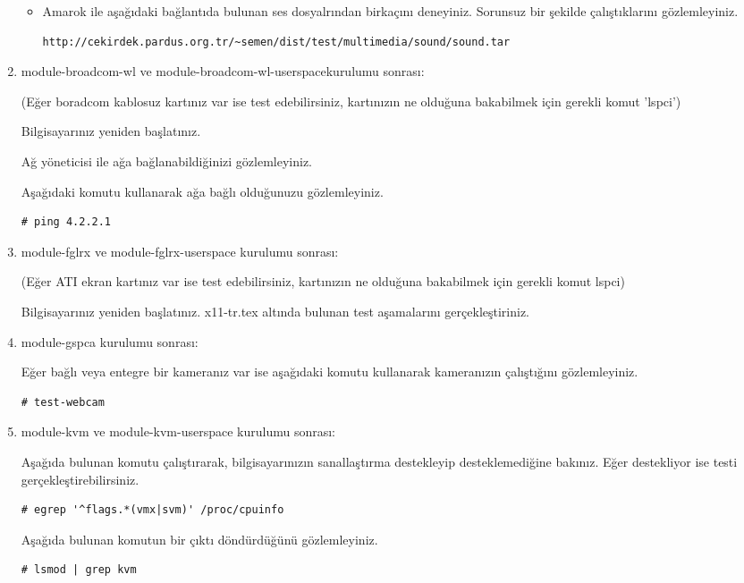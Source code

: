 \documentclass[a4paper,10pt]{article}
\begin{document}
\begin{enumerate}
\begin{itemize}
\item Amarok ile aşağıdaki bağlantıda bulunan ses dosyalrından birkaçını deneyiniz. Sorunsuz bir şekilde çalıştıklarını gözlemleyiniz.
\begin{verbatim}
http://cekirdek.pardus.org.tr/~semen/dist/test/multimedia/sound/sound.tar 
\end{verbatim}

\end{itemize}

\item module-broadcom-wl ve module-broadcom-wl-userspacekurulumu sonrası: 

(Eğer boradcom kablosuz kartınız var ise test edebilirsiniz, kartınızın ne olduğuna bakabilmek için gerekli komut 'lspci')

Bilgisayarınız yeniden başlatınız.

Ağ yöneticisi ile ağa bağlanabildiğinizi gözlemleyiniz.

Aşağıdaki komutu kullanarak ağa bağlı olduğunuzu gözlemleyiniz.
\begin{verbatim}
# ping 4.2.2.1 
\end{verbatim}

\item module-fglrx ve module-fglrx-userspace kurulumu sonrası: 

(Eğer ATI ekran kartınız var ise test edebilirsiniz, kartınızın ne olduğuna bakabilmek için gerekli komut lspci)

Bilgisayarınız yeniden başlatınız. x11-tr.tex altında bulunan test aşamalarını gerçekleştiriniz.

\item module-gspca kurulumu sonrası:

Eğer bağlı veya entegre bir kameranız var ise aşağıdaki komutu kullanarak kameranızın çalıştığını gözlemleyiniz.
\begin{verbatim}
# test-webcam
\end{verbatim}

\item module-kvm ve module-kvm-userspace kurulumu sonrası:

Aşağıda bulunan komutu çalıştırarak, bilgisayarınızın sanallaştırma destekleyip desteklemediğine bakınız. Eğer destekliyor ise testi gerçekleştirebilirsiniz. 
\begin{verbatim}
# egrep '^flags.*(vmx|svm)' /proc/cpuinfo
\end{verbatim}

Aşağıda bulunan komutun bir çıktı döndürdüğünü gözlemleyiniz.
\begin{verbatim}
# lsmod | grep kvm
\end{verbatim}


\end{enumerate}
\end{document}
